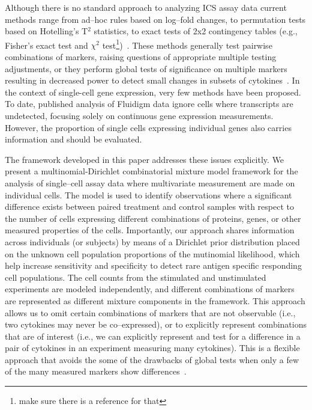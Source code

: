 \documentclass[11pt]{article}
\begin{document}
Although there is no standard approach to analyzing ICS assay data current methods range from ad--hoc rules based on log--fold changes, to permutation tests based on Hotelling's T$^2$ statistics, to exact tests of 2x2 contingency tables (e.g., Fisher's exact test and $\chi^2$ test\footnote{make sure there is a reference for that})~\cite{Trigona:2003,Sinclair:2004hs,Horton:2007tsa,Nason:2006dx}. These methods generally test pairwise combinations of markers, raising questions of appropriate multiple testing adjustments, or they perform global tests of significance on multiple markers resulting in decreased power to detect small changes in subsets of cytokines~\cite{Proschan:2009ks,Nason:2006dx}. In the context of single-cell gene expression, very few methods have been proposed. To date, published analysis of Fluidigm data ignore cells where transcripts are undetected, focusing solely on continuous gene expression measurements. However, the proportion of single cells expressing individual genes also carries information and should be evaluated.



The framework developed in this paper addresses these issues explicitly. We present a multinomial-Dirichlet combinatorial mixture model framework for the analysis of single--cell assay data where multivariate measurement are made on individual cells. The model is used to identify observations where a significant difference exists between paired treatment and control samples with respect to the number of cells expressing  different combinations of proteins, genes, or other measured properties of the cells. Importantly, our approach shares information across individuals (or subjects) by means of a Dirichlet prior distribution placed on the unknown cell population proportions of the mutinomial likelihood, which help increase sensitivity and specificity to detect rare antigen specific responding cell populations. The cell counts from the stimulated and unstimulated experiments are modeled independently, and different combinations of markers are represented as different mixture components in the framework. This approach allows us to omit certain combinations of markers that are not observable (i.e., two cytokines may never be co--expressed), or to explicitly represent combinations that are of interest (i.e., we can explicitly represent and test for a difference in a pair of cytokines in an experiment measuring many cytokines). This is a flexible approach that avoids the some of the drawbacks of global tests when only a few of the many measured markers show differences~\cite{Nason:2006dx}.
\end{document}
